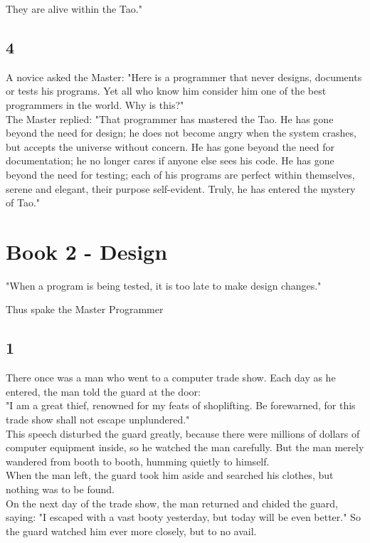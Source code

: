 \documentclass[14pt, letterpaper]{book}
\begin{document}
They are alive within the Tao."

\section*{4}
A novice asked the Master: "Here is a programmer that never designs, documents or tests his programs. Yet all who know him consider him one of the best programmers in the world. Why is this?"\\

The Master replied: "That programmer has mastered the Tao. He has gone beyond the need for design; he does not become angry when the system crashes, but accepts the universe without concern. He has gone beyond the need for documentation; he no longer cares if anyone else sees his code. He has gone beyond the need for testing; each of his programs are perfect within themselves, serene and elegant, their purpose self-evident. Truly, he has entered the mystery of Tao."

\chapter*{Book 2 - Design}
\epigraph{"When a program is being tested, it is too late to make design changes."}{Thus spake the Master Programmer}

\section*{1}
There once was a man who went to a computer trade show. Each day as he entered, the man told the guard at the door:\\

"I am a great thief, renowned for my feats of shoplifting. Be forewarned, for this trade show shall not escape unplundered."\\

This speech disturbed the guard greatly, because there were millions of dollars of computer equipment inside, so he watched the man carefully. But the man merely wandered from booth to booth, humming quietly to himself.\\

When the man left, the guard took him aside and searched his clothes, but nothing was to be found.\\

On the next day of the trade show, the man returned and chided the guard, saying: "I escaped with a vast booty yesterday, but today will be even better." So the guard watched him ever more closely, but to no avail.\\
\end{document}

